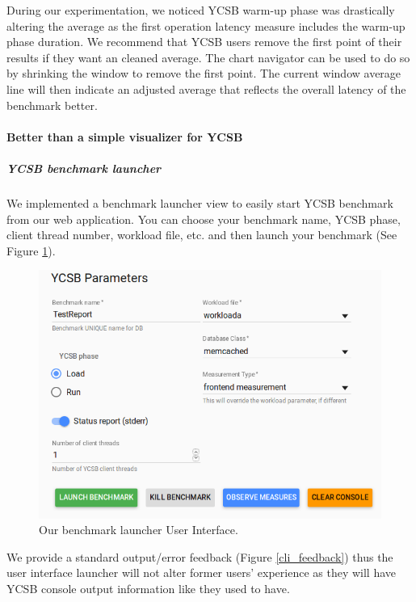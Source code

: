 \documentclass[a4paper,11pt]{report}
\begin{document}
During our experimentation, we noticed YCSB warm-up phase was drastically altering the average as the first operation latency measure includes the warm-up phase duration. We recommend that YCSB users remove the first point of their results if they want an cleaned average. The chart navigator can be used to do so by shrinking the window to remove the first point. The current window average line will then indicate an adjusted average that reflects the overall latency of the benchmark better.

\paragraph{Better than a simple visualizer for YCSB}

\subparagraph{YCSB benchmark launcher}

We implemented a benchmark launcher view to easily start YCSB benchmark from our web application. You can choose your benchmark name, YCSB phase, client thread number, workload file, etc. and then launch your benchmark (See Figure \ref{launcher_ui}).

\begin{figure}[ht]
\begin{center}
\includegraphics[width=1\linewidth]{images/launcher_ui.png}
\caption{Our benchmark launcher User Interface.}
\label{launcher_ui}
\end{center}
\end{figure}

We provide a standard output/error feedback (Figure \ref{cli_feedback}) thus the user interface launcher will not alter former users' experience as they will have YCSB console output information like they used to have.
\end{document}
